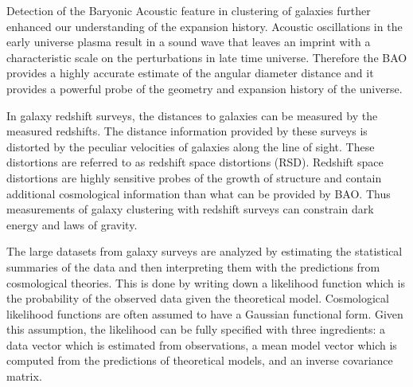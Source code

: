Detection of the Baryonic Acoustic feature in clustering of galaxies 
further enhanced our understanding of the expansion history. 
Acoustic oscillations in the early universe plasma result in a sound wave 
that leaves an imprint with a characteristic scale on the perturbations 
in late time universe. Therefore the BAO provides a highly accurate estimate of the angular diameter 
distance and it provides a powerful probe of the geometry and expansion history of the universe. 

In galaxy redshift surveys, the distances to galaxies can be measured by the measured 
redshifts. The distance information provided by these surveys is distorted by the peculiar 
velocities of galaxies along the line of sight. These distortions are referred to as redshift space 
distortions (RSD). Redshift space distortions are highly sensitive probes of the growth of structure 
and contain additional cosmological information than what can be provided by BAO. Thus measurements of 
galaxy clustering with redshift surveys can constrain dark energy and laws of gravity.



The large datasets from galaxy surveys are analyzed by estimating the statistical summaries of the 
data and then interpreting them with the predictions from cosmological theories. This is done by writing down 
a likelihood function which is the probability of the observed data given the theoretical model.
Cosmological likelihood functions are often assumed to have a Gaussian functional form. Given this assumption, the likelihood 
can be fully specified with three ingredients: a data vector which is estimated from observations, a mean model vector 
which is computed from the predictions of theoretical models, and an inverse covariance matrix. 

